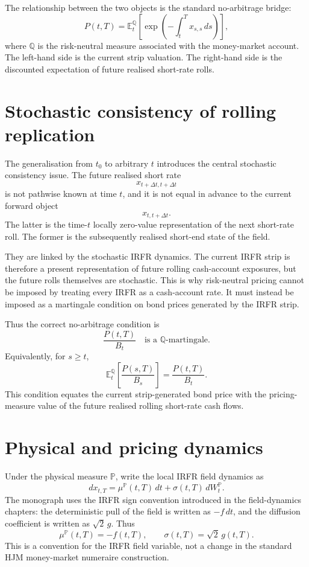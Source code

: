 \documentclass[11pt,oneside]{book}
\begin{document}
The relationship between the two objects is the standard no-arbitrage
bridge:
\[
P(t,T)
=
\mathbb E_t^{\mathbb Q}
\left[
\exp\left(-\int_t^T x_{s,s}\,ds\right)
\right],
\]
where \(\mathbb Q\) is the risk-neutral measure associated with the
money-market account. The left-hand side is the current strip valuation.
The right-hand side is the discounted expectation of future realised
short-rate rolls.

\section{Stochastic consistency of rolling replication}
\label{stochastic-consistency-of-rolling-replication}

The generalisation from \(t_0\) to arbitrary \(t\) introduces the central
stochastic consistency issue. The future realised short rate
\[
x_{t+\Delta t,t+\Delta t}
\]
is not pathwise known at time \(t\), and it is not equal in advance to the
current forward object
\[
x_{t,t+\Delta t}.
\]
The latter is the time-\(t\) locally zero-value representation of the next
short-rate roll. The former is the subsequently realised short-end state
of the field.

They are linked by the stochastic IRFR dynamics. The current IRFR strip is
therefore a present representation of future rolling cash-account
exposures, but the future rolls themselves are stochastic. This is why
risk-neutral pricing cannot be imposed by treating every IRFR as a
cash-account rate. It must instead be imposed as a martingale condition on
bond prices generated by the IRFR strip.

Thus the correct no-arbitrage condition is
\[
\frac{P(t,T)}{B_t}
\quad\text{is a }\mathbb Q\text{-martingale}.
\]
Equivalently, for \(s\geq t\),
\[
\mathbb E_t^{\mathbb Q}
\left[
\frac{P(s,T)}{B_s}
\right]
=
\frac{P(t,T)}{B_t}.
\]
This condition equates the current strip-generated bond price with the
pricing-measure value of the future realised rolling short-rate cash
flows.


\section{Physical and pricing dynamics}
\label{physical-and-pricing-dynamics}

Under the physical measure \(\mathbb P\), write the local IRFR field
dynamics as
\[
dx_{t,T}
=
\mu^{\mathbb P}(t,T)\,dt+
\sigma(t,T)\,dW_t^{\mathbb P}.
\]
The monograph uses the IRFR sign convention introduced in the field-dynamics
chapters: the deterministic pull of the field is written as \(-f\,dt\), and
the diffusion coefficient is written as \(\sqrt{2}\,g\). Thus
\[
\mu^{\mathbb P}(t,T)=-f(t,T),
\qquad
\sigma(t,T)=\sqrt{2}\,g(t,T).
\]
This is a convention for the IRFR field variable, not a change in the
standard HJM money-market numeraire construction.
\end{document}
